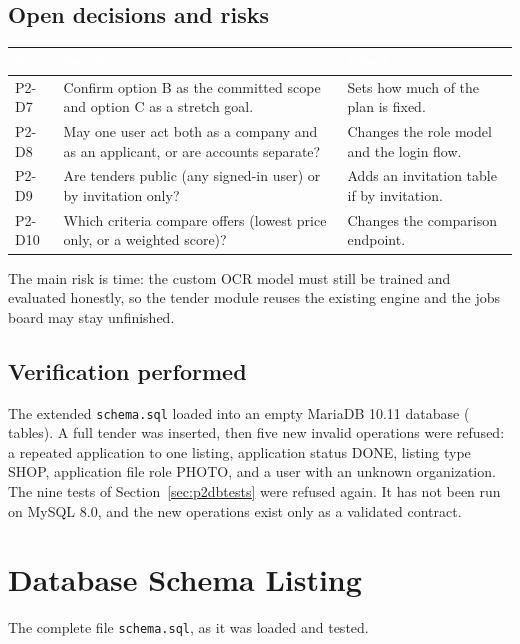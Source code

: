 \documentclass[11pt,a4paper]{report}
\newcommand{\hdr}[1]{\textcolor{white}{\sffamily\bfseries #1}}
\newcommand{\tblstart}{\rowcolors{2}{white}{rowgray}\arrayrulecolor{teal!60}}
\newcommand{\hdrrow}{\rowcolor{navy}}
\begin{document}
\section{Open decisions and risks}
{\tblstart\small
\begin{longtable}{L{1.4cm}L{6.4cm}L{6.0cm}}
\hdrrow \hdr{No.} & \hdr{Decision} & \hdr{Effect}\\ \endhead
P2-D7 & Confirm option B as the committed scope and option C as a stretch goal. & Sets how much of the plan is fixed.\\
P2-D8 & May one user act both as a company and as an applicant, or are accounts separate? & Changes the role model and the login flow.\\
P2-D9 & Are tenders public (any signed-in user) or by invitation only? & Adds an invitation table if by invitation.\\
P2-D10 & Which criteria compare offers (lowest price only, or a weighted score)? & Changes the comparison endpoint.\\
\hline
\end{longtable}}
The main risk is time: the custom OCR model must still be trained and evaluated honestly, so the tender module reuses the existing engine and the jobs board may stay unfinished.

\section{Verification performed}
The extended \texttt{schema.sql} loaded into an empty MariaDB 10.11 database (\nTables{} tables). A full tender was inserted, then five new invalid operations were refused: a repeated application to one listing, application status DONE, listing type SHOP, application file role PHOTO, and a user with an unknown organization. The nine tests of Section~\ref{sec:p2dbtests} were refused again. It has not been run on MySQL 8.0, and the new operations exist only as a validated contract.

\appendix
\chapter{Database Schema Listing}
The complete file \texttt{schema.sql}, as it was loaded and tested.
{\lstset{basicstyle=\ttfamily\tiny,language=SQL}
}
\end{document}
